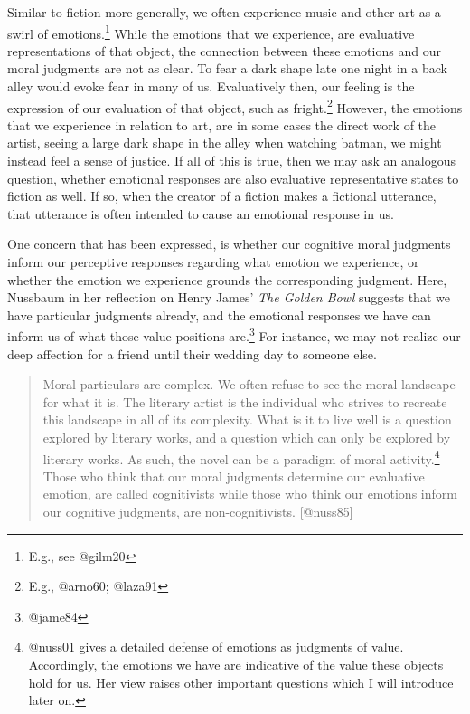 \documentclass[
  letterpaper,
  DIV=11,
  numbers=noendperiod]{scrartcl}
\theoremstyle{remark}
\begin{document}
Similar to fiction more generally, we often experience music and other
art as a swirl of emotions.\footnote{E.g., see @gilm20} While the
emotions that we experience, are evaluative representations of that
object, the connection between these emotions and our moral judgments
are not as clear. To fear a dark shape late one night in a back alley
would evoke fear in many of us. Evaluatively then, our feeling is the
expression of our evaluation of that object, such as fright.\footnote{E.g.,
  @arno60; @laza91} However, the emotions that we experience in relation
to art, are in some cases the direct work of the artist, seeing a large
dark shape in the alley when watching batman, we might instead feel a
sense of justice. If all of this is true, then we may ask an analogous
question, whether emotional responses are also evaluative representative
states to fiction as well. If so, when the creator of a fiction makes a
fictional utterance, that utterance is often intended to cause an
emotional response in us.

One concern that has been expressed, is whether our cognitive moral
judgments inform our perceptive responses regarding what emotion we
experience, or whether the emotion we experience grounds the
corresponding judgment. Here, Nussbaum in her reflection on Henry James'
\emph{The Golden Bowl} suggests that we have particular judgments
already, and the emotional responses we have can inform us of what those
value positions are.\footnote{@jame84} For instance, we may not realize
our deep affection for a friend until their wedding day to someone else.

\begin{quote}
Moral particulars are complex. We often refuse to see the moral
landscape for what it is. The literary artist is the individual who
strives to recreate this landscape in all of its complexity. What is it
to live well is a question explored by literary works, and a question
which can only be explored by literary works. As such, the novel can be
a paradigm of moral activity.\footnote{@nuss01 gives a detailed defense
  of emotions as judgments of value. Accordingly, the emotions we have
  are indicative of the value these objects hold for us. Her view raises
  other important questions which I will introduce later on.} Those who
think that our moral judgments determine our evaluative emotion, are
called cognitivists while those who think our emotions inform our
cognitive judgments, are non-cognitivists. {[}@nuss85{]}
\end{quote}
\end{document}
